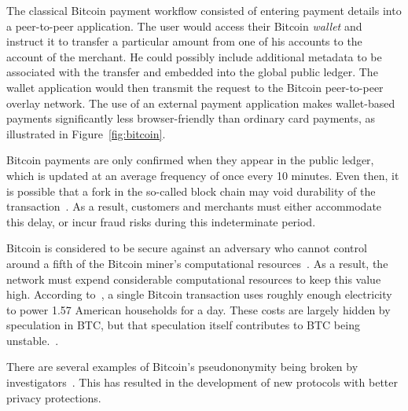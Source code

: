 \documentclass{llncs}
\begin{document}
The
classical Bitcoin payment workflow consisted of entering payment
details into a peer-to-peer application.  The user would access their
Bitcoin {\em wallet} and instruct it to transfer a particular amount
from one of his accounts to the account of the merchant. He could possibly
include additional metadata to be associated with the transfer and
embedded into the global public ledger.
The wallet application would
then transmit the request to the Bitcoin peer-to-peer overlay network.
The use of an external payment application makes wallet-based payments
significantly less browser-friendly than ordinary card payments, as
illustrated in Figure~\ref{fig:bitcoin}.

Bitcoin payments are only confirmed when they appear in the public
ledger, which is updated at an average frequency of once every 10
minutes.  Even then, it is possible that a fork in the so-called block
chain may void durability of the
transaction~\cite{nakamoto2008bitcoin}.  As a result, customers and
merchants must either accommodate this delay, or incur fraud risks
during this indeterminate period.

Bitcoin is considered to be secure against an adversary who cannot
control around a fifth of the Bitcoin miner's computational
resources~\cite{BTC:Bahack13,BTC:MajorityNotEnough,BTC:Eclipse}.  %
As a result, the network must expend considerable computational
resources to keep this value high.
According to~\cite{vice_btc_unsustainable}, a single Bitcoin transaction uses roughly enough
electricity to power 1.57 American households for a day.
These costs are largely hidden by speculation in BTC,
but that speculation itself contributes to BTC being
unstable.~\cite{jeffries_economists_v_btc,lehmann_btc_fools_gold,lewis_btc_is_junk}. %


There are several examples of Bitcoin's pseudononymity being broken
by investigators~\cite{BTC:Anonymity}.  This has resulted in the
development of new protocols with better privacy protections.
\end{document}
